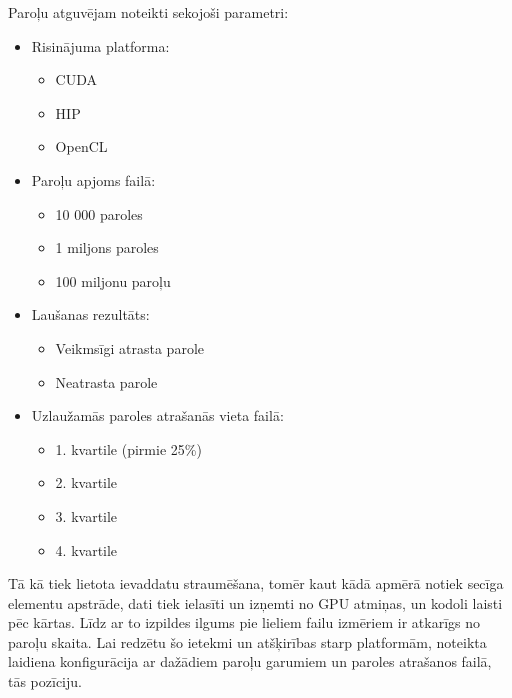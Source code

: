 Paroļu atguvējam noteikti sekojoši parametri: \cite{kursa-darbs}
\begin{itemize}
    \item Risinājuma platforma:
    \begin{itemize}
        \item CUDA 
        \item HIP 
        \item OpenCL 
    \end{itemize}
    \item Paroļu apjoms failā:
    \begin{itemize}
        \item 10 000 paroles
        \item 1 miljons paroles
        \item 100 miljonu paroļu
    \end{itemize}
    \item Laušanas rezultāts:
    \begin{itemize}
        \item Veikmsīgi atrasta parole
        \item Neatrasta parole
    \end{itemize}
    \item Uzlaužamās paroles atrašanās vieta failā:
    \begin{itemize}
        \item 1. kvartile (pirmie 25\%)
        \item 2. kvartile
        \item 3. kvartile
        \item 4. kvartile
    \end{itemize}
\end{itemize}


Tā kā tiek lietota ievaddatu straumēšana, tomēr kaut kādā apmērā notiek secīga
elementu apstrāde, dati tiek ielasīti un izņemti no GPU atmiņas, un kodoli
laisti pēc kārtas. Līdz ar to izpildes ilgums pie lieliem failu izmēriem ir
atkarīgs no paroļu skaita. Lai redzētu šo ietekmi un atšķirības starp
platformām, noteikta laidiena konfigurācija ar dažādiem paroļu garumiem un
paroles atrašanos failā, tās pozīciju.

